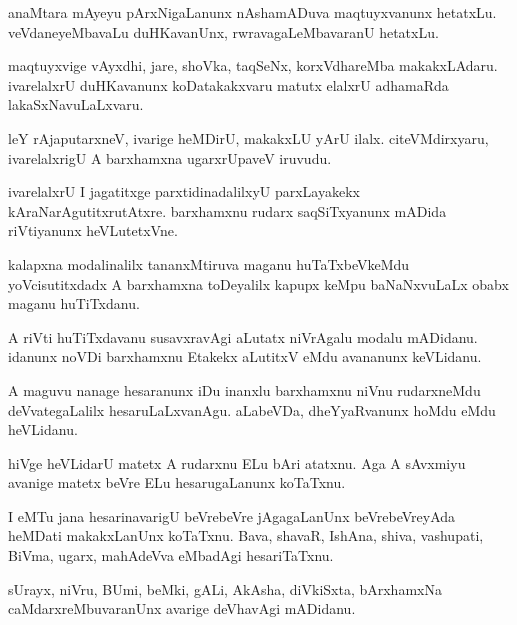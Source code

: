 \documentclass{article}
\begin{document}
\begin{mn}%
anaMtara mAyeyu pArxNigaLanunx nAshamADuva maqtuyxvanunx
hetatxLu. veVdaneyeMbavaLu duHKavanUnx, rwravagaLeMbavaranU hetatxLu.
\end{mn}

\begin{mn}
maqtuyxvige vAyxdhi, jare, shoVka, taqSeNx, korxVdhareMba
makakxLAdaru. ivarelalxrU duHKavanunx koDatakakxvaru matutx elalxrU
adhamaRda lakaSxNavuLaLxvaru.
\end{mn}

\begin{mn}
leY rAjaputarxneV, ivarige heMDirU, makakxLU yArU
ilalx. citeVMdirxyaru, ivarelalxrigU A barxhamxna ugarxrUpaveV iruvudu.
\end{mn}

\begin{mn}
ivarelalxrU I jagatitxge parxtidinadalilxyU parxLayakekx
kAraNarAgutitxrutAtxre. barxhamxnu rudarx saqSiTxyanunx mADida
riVtiyanunx heVLutetxVne.
\end{mn}

\begin{mn}
kalapxna modalinalilx tananxMtiruva maganu huTaTxbeVkeMdu
yoVcisutitxdadx A barxhamxna toDeyalilx kapupx keMpu baNaNxvuLaLx
obabx maganu huTiTxdanu.
\end{mn}


\begin{mn}%
A riVti huTiTxdavanu susavxravAgi aLutatx niVrAgalu modalu
mADidanu. idanunx noVDi barxhamxnu Etakekx aLutitxV eMdu avananunx keVLidanu.
\end{mn}

\begin{mn}
A maguvu nanage hesaranunx iDu inanxlu barxhamxnu niVnu rudarxneMdu
deVvategaLalilx hesaruLaLxvanAgu. aLabeVDa, dheYyaRvanunx hoMdu eMdu heVLidanu.
\end{mn}

\begin{mn}
hiVge heVLidarU matetx A rudarxnu ELu bAri atatxnu. Aga A sAvxmiyu
avanige matetx beVre ELu hesarugaLanunx koTaTxnu.
\end{mn}

\begin{mn}
I eMTu jana hesarinavarigU beVrebeVre jAgagaLanUnx beVrebeVreyAda
heMDati makakxLanUnx koTaTxnu. Bava, shavaR, IshAna, shiva, vashupati,
BiVma, ugarx, mahAdeVva eMbadAgi hesariTaTxnu.
\end{mn}

\begin{mn}
sUrayx, niVru, BUmi, beMki, gALi, AkAsha, diVkiSxta, bArxhamxNa
caMdarxreMbuvaranUnx avarige deVhavAgi mADidanu.
\end{mn}
\end{document}
